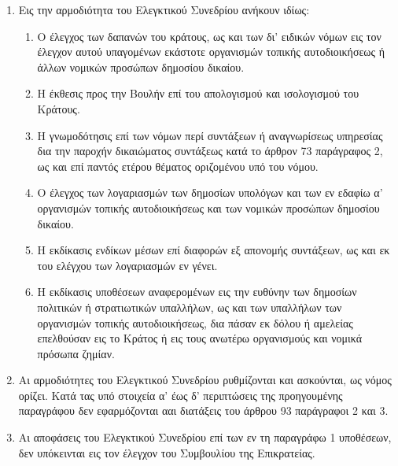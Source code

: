 \documentclass[twoside, a4paper, 10pt]{article}
\begin{document}
\begin{multicols}{2}
\begin{enumerate}
\begin{BigQuote}
\begin{enumerate}
  \item[1.] Εις την αρμοδιότητα του Ελεγκτικού Συνεδρίου ανήκουν ιδίως:
  \begin{enumerate}
  	\item[α)] Ο έλεγχος των δαπανών του κράτους, ως και των δι' ειδικών νόμων εις τον έλεγχον αυτού υπαγομένων εκάστοτε οργανισμών τοπικής αυτοδιοικήσεως ή άλλων νομικών προσώπων δημοσίου δικαίου.
  	\item[β)] Η έκθεσις προς την Βουλήν επί του απολογισμού και ισολογισμού του Κράτους.
  	\item[γ)] Η γνωμοδότησις  επί των νόμων περί συντάξεων ή αναγνωρίσεως υπηρεσίας δια την παροχήν δικαιώματος συντάξεως κατά το άρθρον 73 παράγραφος 2, ως  και επί παντός ετέρου θέματος οριζομένου υπό του νόμου.
  	\item[δ)] Ο έλεγχος των λογαριασμών των δημοσίων υπολόγων και των εν εδαφίω α' οργανισμών τοπικής αυτοδιοικήσεως και των νομικών προσώπων δημοσίου δικαίου.
  	\item[ε)] Η εκδίκασις ενδίκων μέσων επί διαφορών εξ απονομής συντάξεων, ως και εκ του ελέγχου των λογαριασμών εν γένει.
  	\item[στ)] Η εκδίκασις υποθέσεων αναφερομένων εις την ευθύνην των δημοσίων πολιτικών ή στρατιωτικών υπαλλήλων, ως και των υπαλλήλων των οργανισμών τοπικής αυτοδιοικήσεως, δια πάσαν εκ δόλου ή αμελείας επελθούσαν εις το Κράτος ή εις τους ανωτέρω οργανισμούς και νομικά πρόσωπα ζημίαν.
  \end{enumerate}
  \item[2.] Αι αρμοδιότητες του Ελεγκτικού Συνεδρίου ρυθμίζονται και ασκούνται, ως νόμος ορίζει.
Κατά τας υπό στοιχεία α' έως δ' περιπτώσεις της προηγουμένης παραγράφου δεν εφαρμόζονται ααι διατάξεις του άρθρου 93 παράγραφοι 2 και 3.
  \item[3.] Αι αποφάσεις του Ελεγκτικού Συνεδρίου επί των εν τη παραγράφω 1 υποθέσεων, δεν υπόκεινται εις τον έλεγχον του Συμβουλίου της Επικρατείας.
\end{enumerate}


\end{BigQuote}
\end{enumerate}
\end{multicols}
\end{document}
